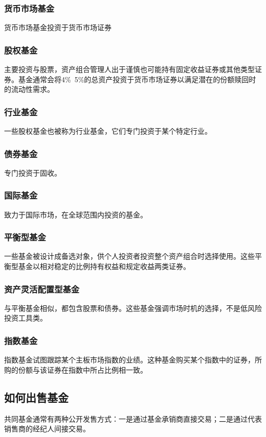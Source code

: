 \documentclass{article}
\begin{document}
\subsubsection{货币市场基金}
货币市场基金投资于货币市场证券

\subsubsection{股权基金}
主要投资与股票，资产组合管理人出于谨慎也可能持有固定收益证券或其他类型证券。基金通常会将4\%~5\%的总资产投资于货币市场证券以满足潜在的份额赎回时的流动性需求。

\subsubsection{行业基金}
一些股权基金也被称为行业基金，它们专门投资于某个特定行业。

\subsubsection{债券基金}
专门投资于固收。

\subsubsection{国际基金}
致力于国际市场，在全球范围内投资的基金。

\subsubsection{平衡型基金}
一些基金被设计成备选对象，供个人投资者投资整个资产组合时选择使用。这些平衡型基金以相对稳定的比例持有权益和规定收益两类证券。

\subsubsection{资产灵活配置型基金}
与平衡基金相似，都包含股票和债券。这些基金强调市场时机的选择，不是低风险投资工具类。

\subsubsection{指数基金}
指数基金试图跟踪某个主板市场指数的业绩。这种基金购买某个指数中的证券，所购的份额与该证券在指数中所占比例相一致。

\subsection{如何出售基金}
共同基金通常有两种公开发售方式：一是通过基金承销商直接交易；二是通过代表销售商的经纪人间接交易。
\end{document}
